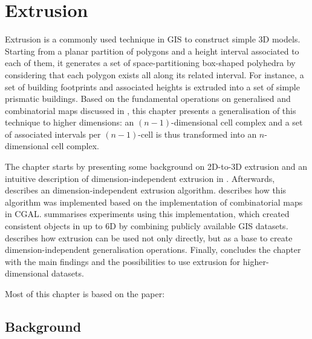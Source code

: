 
\chapter{Extrusion}
\label{ch:extrusion}

Extrusion is a commonly used technique in GIS to construct simple 3D models.
Starting from a planar partition of polygons and a height interval associated to each of them, it generates a set of space-partitioning box-shaped polyhedra by considering that each polygon exists all along its related interval.
For instance, a set of building footprints and associated heights is extruded into a set of simple prismatic buildings.
Based on the fundamental operations on generalised and combinatorial maps discussed in , this chapter presents a generalisation of this technique to higher dimensions: an $(n-1)$-dimensional cell complex and a set of associated intervals per $(n-1)$-cell is thus transformed into an $n$-dimensional cell complex.

The chapter starts by presenting some background on 2D-to-3D extrusion and an intuitive description of dimension-independent extrusion in .
Afterwards,  describes an dimension-independent extrusion algorithm.
 describes how this algorithm was implemented based on the implementation of combinatorial maps in CGAL.\@
{} summarises experiments using this implementation, which created consistent objects in up to 6D by combining publicly available GIS datasets.
 describes how extrusion can be used not only directly, but as a base to create dimension-independent generalisation operations.
Finally,  concludes the chapter with the main findings and the possibilities to use extrusion for higher-dimensional datasets.

Most of this chapter is based on the paper:
\begin{itemize}
\paperijgisextrusion%
\end{itemize}

\section{Background}
\label{se:extrusion-background}

